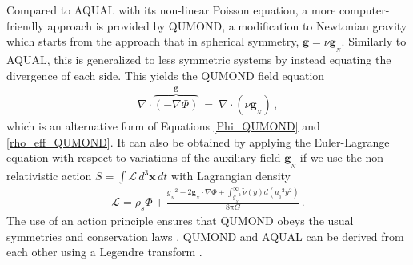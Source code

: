 \documentclass[fleqn,usenatbib,useAMS,onecolumn]{mnras} %
\begin{document}
Compared to AQUAL with its non-linear Poisson equation, a more computer-friendly approach is provided by QUMOND, a modification to Newtonian gravity which starts from the approach that in spherical symmetry, $\bm{g} = \nu \bm{g}_{_N}$. Similarly to AQUAL, this is generalized to less symmetric systems by instead equating the divergence of each side. This yields the QUMOND field equation
\begin{eqnarray}
	\nabla \cdot \overbrace{\left( -\nabla \Phi \right)}^{\bm{g}} ~=~ \nabla \cdot \left( \nu \bm{g}_{_N} \right) \, ,
	\label{Governing_equation_QUMOND}
\end{eqnarray}
which is an alternative form of Equations \ref{Phi_QUMOND} and \ref{rho_eff_QUMOND}. It can also be obtained by applying the Euler-Lagrange equation with respect to variations of the auxiliary field $\bm{g}_{_N}$ if we use the non-relativistic action $S = \int \! \mathcal{L} \, d^3 \bm{x} \, dt$ with Lagrangian density
\begin{eqnarray}
	\mathcal{L} = \rho_s \Phi + \frac{{g_{_N}}^2 - 2\bm{g}_{_N} \cdot \nabla \Phi + \int^\infty_{{g_{_N}}^2} \widetilde{\nu}\left( y \right) d \left( {a_{_0}}^2 y^2 \right)}{8\mathrm{\pi} G} \, .
	\label{Lag}
\end{eqnarray}
The use of an action principle ensures that QUMOND obeys the usual symmetries and conservation laws \citep{QUMOND}. QUMOND and AQUAL can be derived from each other using a Legendre transform \citep{Milgrom_2012_Legendre}.



 
 
\end{document}
